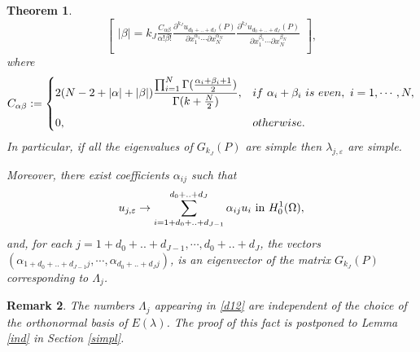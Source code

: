 \documentclass[11pt,reqno]{article}
\newtheorem{teo}{Theorem}[section]
\newtheorem{rem}[teo]{Remark}
\numberwithin{equation}{section}
\newcommand\e\varepsilon
\newcommand\la\lambda
\renewcommand\O\Omega
\begin{document}
\begin{teo}
$$\begin{bmatrix}
{{           |\beta|={ k_J}}}\frac{C_{\alpha\beta}}{\alpha!\beta!}\frac{\partial^{{ k_J}} u_{d_0+..+d_J} (P)}{\partial x_{1}^{\alpha_1}\cdots\partial x_{N}^{\alpha_N}}\frac{\partial^{{ k_J}} u_{d_0+..+d_J} (P)}{\partial x_{1}^{\beta_1}\cdots\partial x_{N}^{\beta_N}} \\
\end{bmatrix},$$
      where 
        \begin{equation}\label{defCalbe}
            C_{\alpha\beta}:=
            \begin{cases}
              \displaystyle 2(N-2+|\alpha|+|\beta|)\frac{\prod_{i=1}^N\Gamma(\frac{\alpha_i+\beta_i+1}{2})}{\Gamma(k+\frac{N}{2})},  &if\ \alpha_i+\beta_i\ is  \ even, \ i=1,\cdots,N,\vspace{2mm}\\
                0,& otherwise.
            \end{cases}
        \end{equation}
 In particular, if all the eigenvalues of $G_{k_J}(P)$ are simple then $\la_{j,\e}$ are simple.
 
 Moreover, there exist coefficients $\alpha_{ij}$ such that
        \begin{equation}\label{L2approx}
            u_{j,\e}\to \sum_{i=1+d_0+..+d_{J-1}}^{d_0+..+d_J}\alpha_{ij} u_i \hbox{ in } H^1_0(\O),
        \end{equation}
        and, for each $j=1+d_0+..+d_{J-1},\cdots,d_0+..+d_J$, the vectors $(\alpha_{1+d_0+..+d_{J-1}j},\cdots,\alpha_{d_0+..+d_Jj})$,  is an eigenvector of the matrix $G_{k_J}(P)$  corresponding to $\Lambda_j$.
        
		 
       

      
	\end{teo}
\begin{rem}
   The numbers $\Lambda_j$ appearing in \eqref{d12} are independent of the choice of the orthonormal basis of $E(\la)$. The proof of this fact  is postponed to Lemma \ref{ind} in Section \ref{simpl}. 
\end{rem}
\end{document}
